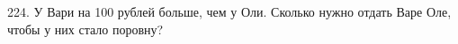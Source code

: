 224. У Вари на 100 рублей больше, чем у Оли. Сколько нужно отдать Варе Оле, чтобы у них стало поровну?\\
